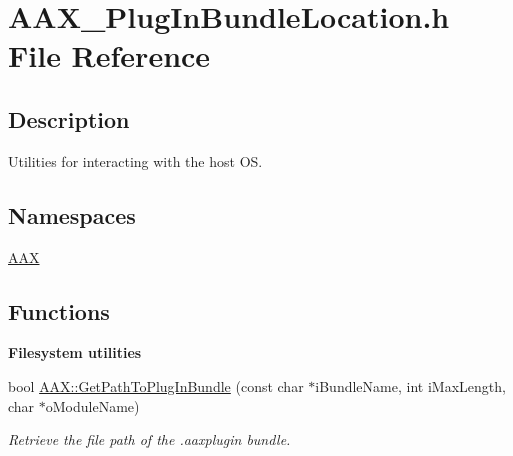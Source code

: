 \hypertarget{a00280}{}\section{A\+A\+X\+\_\+\+Plug\+In\+Bundle\+Location.\+h File Reference}
\label{a00280}


\subsection{Description}
Utilities for interacting with the host O\+S. 

\subsection*{Namespaces}
\begin{DoxyCompactItemize}
\item 
 \hyperlink{a00288}{A\+A\+X}
\end{DoxyCompactItemize}
\subsection*{Functions}
\begin{Indent}{\bf Filesystem utilities}\par
\begin{DoxyCompactItemize}
\item 
bool \hyperlink{a00370_ga0bf6aab757ecbd440276bb001de89f19}{A\+A\+X\+::\+Get\+Path\+To\+Plug\+In\+Bundle} (const char $\ast$i\+Bundle\+Name, int i\+Max\+Length, char $\ast$o\+Module\+Name)
\begin{DoxyCompactList}\small\item\em Retrieve the file path of the .aaxplugin bundle. \end{DoxyCompactList}\end{DoxyCompactItemize}
\end{Indent}
